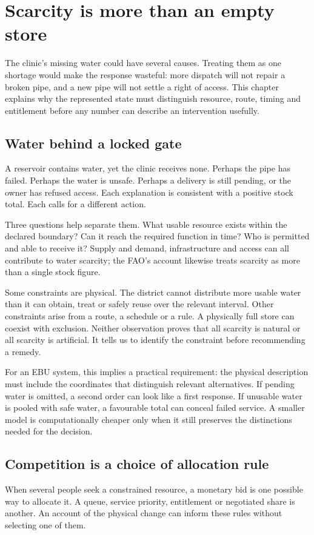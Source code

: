 \chapter{Scarcity is more than an empty store}\label{ch:scarcity}

The clinic's missing water could have several causes. Treating them as one shortage would make the response wasteful: more dispatch will not repair a broken pipe, and a new pipe will not settle a right of access. This chapter explains why the represented state must distinguish resource, route, timing and entitlement before any number can describe an intervention usefully.

\section{Water behind a locked gate}
A reservoir contains water, yet the clinic receives none. Perhaps the pipe has failed. Perhaps the water is unsafe. Perhaps a delivery is still pending, or the owner has refused access. Each explanation is consistent with a positive stock total. Each calls for a different action.

Three questions help separate them. What usable resource exists within the declared boundary? Can it reach the required function in time? Who is permitted and able to receive it? Supply and demand, infrastructure and access can all contribute to water scarcity; the FAO's account likewise treats scarcity as more than a single stock figure.\cite{intro-water}

Some constraints are physical. The district cannot distribute more usable water than it can obtain, treat or safely reuse over the relevant interval. Other constraints arise from a route, a schedule or a rule. A physically full store can coexist with exclusion. Neither observation proves that all scarcity is natural or all scarcity is artificial. It tells us to identify the constraint before recommending a remedy.

For an EBU system, this implies a practical requirement: the physical description must include the coordinates that distinguish relevant alternatives. If pending water is omitted, a second order can look like a first response. If unusable water is pooled with safe water, a favourable total can conceal failed service. A smaller model is computationally cheaper only when it still preserves the distinctions needed for the decision.

\section{Competition is a choice of allocation rule}
When several people seek a constrained resource, a monetary bid is one possible way to allocate it. A queue, service priority, entitlement or negotiated share is another. An account of the physical change can inform these rules without selecting one of them.

